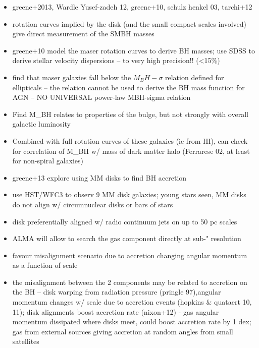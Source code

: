 \begin{itemize}
\item greene+2013, Wardle Yusef-zadeh 12, greene+10, schulz henkel 03, tarchi+12
\item rotation curves implied by the disk (and the small compact scales involved) give direct measurement of the SMBH masses
\item greene+10 model the maser rotation curves to derive BH masses; use SDSS to derive stellar velocity dispersions -- to very high precision!! (<15\%)
\item find that maser galaxies fall below the $M_BH-\sigma$ relation defined for ellipticals -- the relation cannot be used to derive the BH mass function for AGN -- NO UNIVERSAL power-law MBH-sigma relation
\item Find M_BH relates to properties of the bulge, but not strongly with overall galactic luminosity
\item Combined with full rotation curves of these galaxies (ie from HI), can check for correlation of M_BH w/ mass of dark matter halo (Ferrarese 02, at least for non-spiral galaxies)
\item greene+13 explore using MM disks to find BH accretion
\item use HST/WFC3 to observ 9 MM disk galaxies; young stars seen, MM disks do not align w/ circumnuclear disks or bars of stars
\item disk preferentially aligned w/ radio continuum jets on up to 50 pc scales
\item ALMA will allow to search the gas component directly at sub-" resolution
\item favour misalignment scenario due to accretion changing angular momentum as a function of scale
\item the misalignment between the 2 components may be related to accretion on the BH -- disk warping from radiation pressure (pringle 97),angular momentum changes w/ scale due to accretion events (hopkins \& quataert 10, 11); disk alignments boost accretion rate (nixon+12) - gas angular momentum dissipated where disks meet, could boost accretion rate by 1 dex; gas from external sources giving accretion at random angles from small satellites
\end{itemize}


